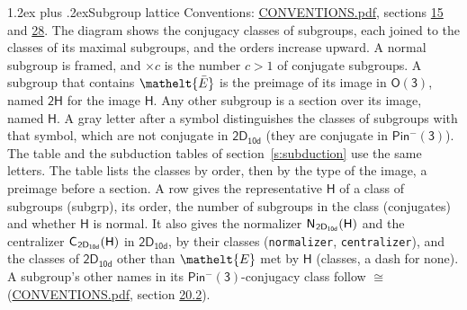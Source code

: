 \documentclass[10pt,a4paper]{article}
\makeatletter
\renewcommand\section{\@startsection{section}{1}{\z@}{-3ex plus -1ex minus -.2ex}%
  {1.2ex plus .2ex}{\normalfont\large\sffamily\bfseries\color{parttitle}}}
\numberwithin{equation}{section}
\newcommand{\eltfont}[1]{{\let\sigma\eltsigma\mathelt{#1}}}
\newcommand{\grp}[1]{\mathsf{#1}}
\newcommand{\cls}[1]{\eltfont{#1}}
\newcommand{\elt}[1]{\eltfont{#1}}
\newcommand{\samecls}{\cong}
\newcommand{\barred}[1]{\bar{#1}}
\newcommand{\hairsp}{\mkern1mu}
\makeatother
\begin{document}
\section{Subgroup lattice}\label{s:subgroups}
Conventions: \href{../../CONVENTIONS.pdf}{CONVENTIONS.pdf}, sections \href{../../../rotation/CONVENTIONS.pdf\#conv.15}{15} and \href{../../CONVENTIONS.pdf\#conv.28}{28}.
The diagram shows the conjugacy classes of subgroups, each joined to the classes of its maximal subgroups, and the orders increase upward. A normal subgroup is framed, and ${\times}c$ is the number $c > 1$ of conjugate subgroups. \label{n:group.H}A subgroup that contains $\elt{\barred{E}}$ is the preimage of its image in $\grp{O(3)}$, named $\grp{2H}$ for the image $\grp{H}$. Any other subgroup is a section over its image, named $\grp{H}$. \label{n:mark.letter}A gray letter after a symbol distinguishes the classes of subgroups with that symbol, which are not conjugate in $\grp{2D_{10d}}$ (they are conjugate in \href{Pinminus3.pdf}{$\grp{Pin^{-}(3)}$}). The table and the subduction tables of section~\ref{s:subduction} use the same letters. The table lists the classes by order, then by the type of the image, a preimage before a section. \label{n:head.subgroup}\label{n:head.order}\label{n:head.conjugates}\label{n:head.normal}A row gives the representative $\grp{H}$ of a class of subgroups (subgrp), its order, the number of subgroups in the class (conjugates) and whether $\grp{H}$ is normal. \label{n:group.normalizer}\label{n:group.centralizer}\label{n:head.classes}It also gives the normalizer $\grp{N}_{\hairsp \grp{2D_{10d}}}(\grp{H})$ and the centralizer $\grp{C}_{\hairsp \grp{2D_{10d}}}(\grp{H})$ in $\grp{2D_{10d}}$, by their classes (\texttt{normalizer}, \texttt{centralizer}), and the classes of $\grp{2D_{10d}}$ other than $\cls{E}$ met by $\grp{H}$ (classes, a dash for none). A subgroup's other names in its \href{Pinminus3.pdf}{$\grp{Pin^{-}(3)}$}-conjugacy class follow $\samecls$ (\href{../../CONVENTIONS.pdf}{CONVENTIONS.pdf}, section \href{../../CONVENTIONS.pdf\#conv.20.2}{20.2}).
\end{document}
